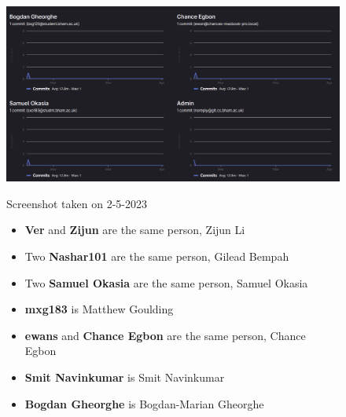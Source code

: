 \documentclass[a4paper]{article}
\begin{document}
\begin{figure}[H]
    \centering
	\begin{minipage}{0.49\textwidth}
		\centering
		\includegraphics[width=\linewidth]{./image/Contributor_3.png}
	\end{minipage}
	\begin{minipage}{0.49\textwidth}
		\footnotesize
		Screenshot taken on 2-5-2023
		\begin{itemize}
			\item \textbf{Ver} and \textbf{Zijun} are the same person, Zijun Li
			\item Two \textbf{Nashar101} are the same person, Gilead Bempah
			\item Two \textbf{Samuel Okasia} are the same person, Samuel Okasia
			\item \textbf{mxg183} is Matthew Goulding
			\item \textbf{ewans} and  \textbf{Chance Egbon} are the same person, Chance Egbon
			\item \textbf{Smit Navinkumar} is Smit Navinkumar
			\item \textbf{Bogdan Gheorghe} is Bogdan-Marian Gheorghe
		\end{itemize}
	\end{minipage}
\end{figure}
\end{document}

